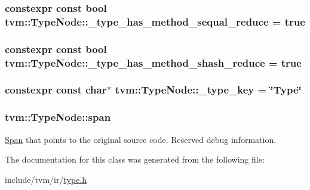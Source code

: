 \subsubsection[{\texorpdfstring{\+\_\+type\+\_\+has\+\_\+method\+\_\+sequal\+\_\+reduce}{_type_has_method_sequal_reduce}}]{\setlength{\rightskip}{0pt plus 5cm}constexpr const bool tvm\+::\+Type\+Node\+::\+\_\+type\+\_\+has\+\_\+method\+\_\+sequal\+\_\+reduce = true\hspace{0.3cm}{\ttfamily [static]}}\hypertarget{classtvm_1_1TypeNode_ab02f7d165755f57689f986aca467a7e5}{}\label{classtvm_1_1TypeNode_ab02f7d165755f57689f986aca467a7e5}
\subsubsection[{\texorpdfstring{\+\_\+type\+\_\+has\+\_\+method\+\_\+shash\+\_\+reduce}{_type_has_method_shash_reduce}}]{\setlength{\rightskip}{0pt plus 5cm}constexpr const bool tvm\+::\+Type\+Node\+::\+\_\+type\+\_\+has\+\_\+method\+\_\+shash\+\_\+reduce = true\hspace{0.3cm}{\ttfamily [static]}}\hypertarget{classtvm_1_1TypeNode_a4179c7d7d55d1141cadfd19547fb1344}{}\label{classtvm_1_1TypeNode_a4179c7d7d55d1141cadfd19547fb1344}
\subsubsection[{\texorpdfstring{\+\_\+type\+\_\+key}{_type_key}}]{\setlength{\rightskip}{0pt plus 5cm}constexpr const char$\ast$ tvm\+::\+Type\+Node\+::\+\_\+type\+\_\+key = \char`\"{}Type\char`\"{}\hspace{0.3cm}{\ttfamily [static]}}\hypertarget{classtvm_1_1TypeNode_afa1561c887198fbf21aaadd4c13eb2c2}{}\label{classtvm_1_1TypeNode_afa1561c887198fbf21aaadd4c13eb2c2}
\subsubsection[{\texorpdfstring{span}{span}}]{ tvm\+::\+Type\+Node\+::span\hspace{0.3cm}{\ttfamily [mutable]}}\hypertarget{classtvm_1_1TypeNode_a7b06d502a5162d51bb205691bbb95bb5}{}\label{classtvm_1_1TypeNode_a7b06d502a5162d51bb205691bbb95bb5}


\hyperlink{classtvm_1_1Span}{Span} that points to the original source code. Reserved debug information. 



The documentation for this class was generated from the following file\+:\begin{DoxyCompactItemize}
\item 
include/tvm/ir/\hyperlink{ir_2type_8h}{type.\+h}\end{DoxyCompactItemize}
